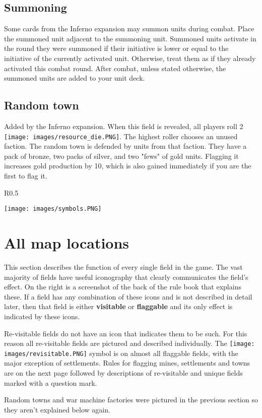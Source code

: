 \documentclass[12pt]{article}
\begin{document}
\subsection*{Summoning}
Some cards from the Inferno expansion may summon units during combat. Place the summoned unit adjacent to the summoning unit. Summoned units activate in the round they were summoned if their initiative is lower or equal to the initiative of the currently activated unit. Otherwise, treat them as if they already activated this combat round. After combat, unless stated otherwise, the summoned units are added to your unit deck.
\subsection*{Random town}
Added by the Inferno expansion. When this field is revealed, all players roll 2 \texttt{[image: images/resource\_die.PNG]}. The highest roller chooses an unused faction. The random town is defended by units from that faction. They have a pack of bronze, two packs of silver, and two "fews" of gold units. Flagging it increases gold production by 10, which is also gained immediately if you are the first to flag it.
\clearpage
\begin{wrapfigure}{R}{0.5\textwidth}
    \begin{center}
    \texttt{[image: images/symbols.PNG]}
    \end{center}
\end{wrapfigure}
\section[All map locations]{All map locations\hypertarget{All}{}}

This section describes the function of every single field in the game. The vast majority of fields have useful iconography that clearly communicates the field's effect. On the right is a screenshot of the back of the rule book that explains these. If a field has any combination of these icons and is not described in detail later, then that field is either \textbf{visitable} or \textbf{flaggable} and its only effect is indicated by these icons.\par
Re-visitable fields do not have an icon that indicates them to be such. For this reason all re-visitable fields are pictured and described individually. The \texttt{[image: images/revisitable.PNG]} symbol is on almost all flaggable fields, with the major exception of settlements. Rules for flagging mines, settlements and towns are on the next page followed by descriptions of re-visitable and unique fields marked with a question mark.\par
Random towns and war machine factories were pictured in the previous section so they aren't explained below again.
\end{document}
